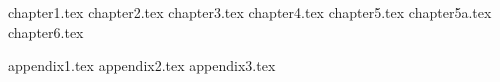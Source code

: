 \documentclass[a4paper,11pt]{book}
\begin{document}
 
\frontmatter

 
\clearpage
\thispagestyle{empty}
 
\tableofcontents
\listoffigures
\listoftables
 
\mainmatter

{chapter1.tex}
{chapter2.tex}
{chapter3.tex}
{chapter4.tex}
{chapter5.tex}
{chapter5a.tex}
{chapter6.tex}

\appendix
{appendix1.tex}
{appendix2.tex}
{appendix3.tex}

 

 
\backmatter

\printbibliography
 
\end{document}
